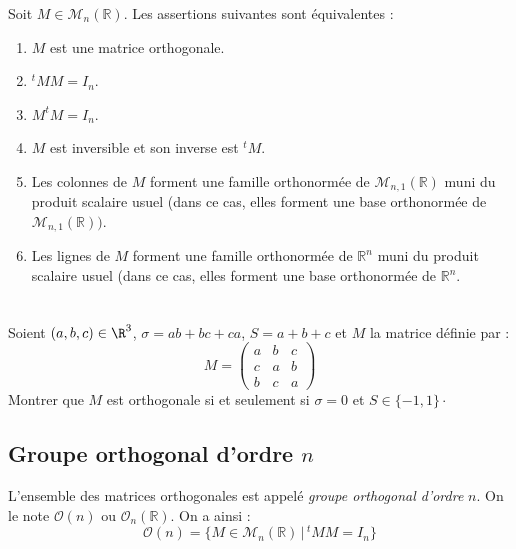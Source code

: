\documentclass[a4paper,10pt]{report}
\begin{document}
\begin{prop} Soit $M \in \mathcal{M}_n(\mathbb{R})$. Les assertions suivantes sont équivalentes :
\begin{enumerate}
\item $M$ est une matrice orthogonale.
\item $^tM M=I_n$.
\item $M ^tM=I_n$.
\item $M$ est inversible et son inverse est $^tM$.
\item Les colonnes de $M$ forment une famille orthonormée de $\mathcal{M}_{n,1}(\mathbb{R})$ muni du produit scalaire usuel (dans ce cas, elles forment une base orthonormée de $\mathcal{M}_{n,1}(\mathbb{R}))$.
\item Les lignes de $M$ forment une famille orthonormée de $\mathbb{R}^n$ muni du produit scalaire usuel (dans ce cas, elles forment une base orthonormée de $\mathbb{R}^n$.
\end{enumerate}
\end{prop}

\begin{preuve}

\vspace{7cm}
\end{preuve}

\newpage

$\phantom{test}$

\vspace{5cm}

\begin{exa} Soient $(a,b,c) \in \R^{3}$, $\sigma = ab + bc + ca$, $S = a + b + c$ et $M$ la matrice définie par :
  \[
  M =
  \begin{pmatrix}
    a & b & c \\
    c & a & b \\
    b & c & a
  \end{pmatrix}
  \]
Montrer que $M$ est orthogonale si et seulement si  $\sigma = 0$ et $S \in \lbrace -1,1 \rbrace\cdot$
\end{exa}
 
\subsection{Groupe orthogonal d'ordre $n$}

\begin{defin} L'ensemble des matrices orthogonales est appelé \textit{groupe orthogonal d'ordre} $n$. On le note $\mathcal{O}(n)$ ou $\mathcal{O}_n(\mathbb{R})$. On a ainsi :
$$ \mathcal{O}(n) = \lbrace M \in \mathcal{M}_n(\mathbb{R}) \, \vert \, ^tM M=I_n \rbrace$$
\end{defin}
\end{document}
